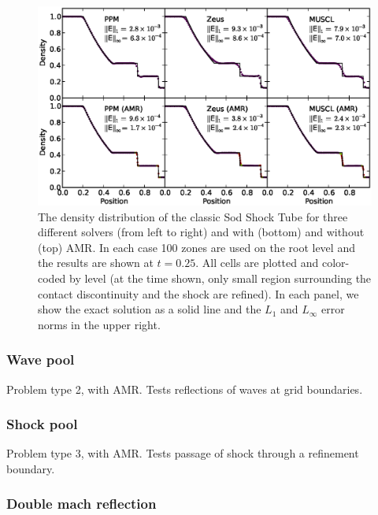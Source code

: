 \begin{figure}
\begin{center}
\includegraphics[width=\textwidth]{figures/SodShockTube.eps}
\caption{The density distribution of the classic Sod Shock Tube for three different solvers (from left to right) and with (bottom) and without (top) AMR.  In each case 100 zones are used on the root level and the results are shown at $t=0.25$.  All cells are plotted and color-coded by level (at the time shown, only small region surrounding the contact discontinuity and the shock are refined).  In each panel, we show the exact solution as a solid line and the $L_1$ and $L_\infty$ error norms in the upper right.}
\label{fig.sodshocktube}
\end{center}
\end{figure}


\subsubsection{Wave pool}
\label{sec.tests.wavepool}
Problem type 2, with AMR.  Tests reflections of waves at grid boundaries.

\subsubsection{Shock pool}
\label{sec.tests.shockpool}
Problem type 3, with AMR.  Tests passage of shock through a refinement boundary.

\subsubsection{Double mach reflection}
\label{sec.tests.doublemach}

